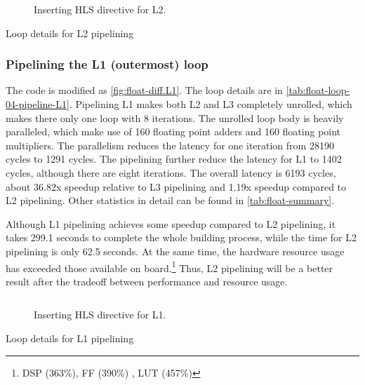 \begin{figure}[h!]
    \centering
    \inputminted{diff}{program/diff.L2}
    \caption{Inserting HLS directive for L2.}\label{fig:float-diff.L2}
\end{figure}

\begin{table}[h!]
    \caption{Loop details for L2 pipelining}
    \label{tab:float-loop-03-pipeline-L2}
    \centering
    
\end{table}

\subsubsection{Pipelining the L1 (outermost) loop}\label{sec:1bL1}

The code is modified as \autoref{fig:float-diff.L1}.
The loop details are in \autoref{tab:float-loop-04-pipeline-L1}.
Pipelining L1 makes both L2 and L3 completely unrolled, which makes there only one loop with 8 iterations.
The unrolled loop body is heavily paralleled, which make use of 160 floating point adders and 160 floating point multipliers.
The parallelism reduces the latency for one iteration from 28190 cycles to 1291 cycles.
The pipelining further reduce the latency for L1 to 1402 cycles, although there are eight iterations.
The overall latency is 6193 cycles, about 36.82x speedup relative to L3 pipelining and 1.19x speedup compared to L2 pipelining.
Other statistics in detail can be found in \autoref{tab:float-summary}.

Although L1 pipelining achieves some speedup compared to L2 pipelining, it takes 299.1 seconds to complete the whole building process, while the time for L2 pipelining is only 62.5 seconds.
At the same time, the hardware resource usage has exceeded those available on board.\footnote{
    DSP (363\%), FF (390\%) , LUT (457\%)
}
Thus, L2 pipelining will be a better result after the tradeoff between performance and resource usage.

\begin{figure}[h!]
    \centering
    \inputminted{diff}{program/diff.L1}
    \caption{Inserting HLS directive for L1.}\label{fig:float-diff.L1}
\end{figure}

\begin{table}[h!]
    \caption{Loop details for L1 pipelining}
    \label{tab:float-loop-04-pipeline-L1}
    \centering
    
\end{table}


